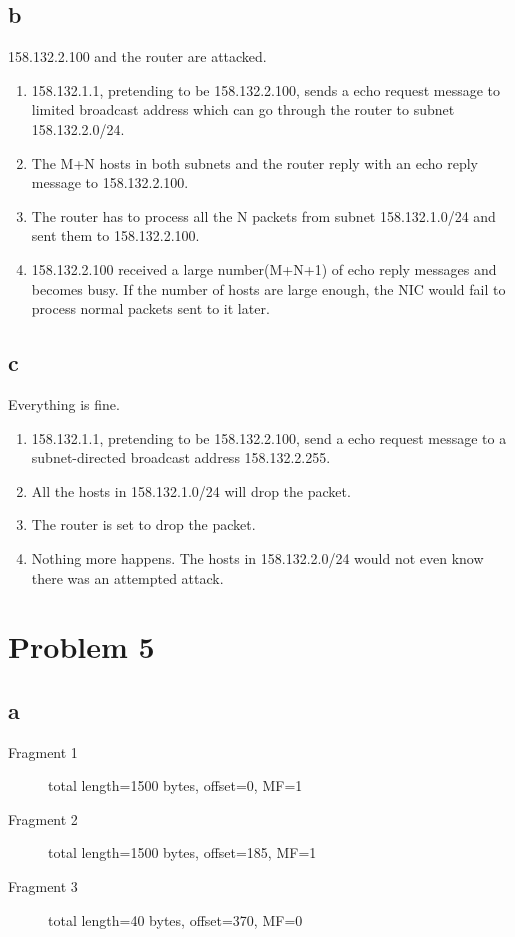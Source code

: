 \documentclass[11pt]{article}
\begin{document}
\subsection{b}
158.132.2.100 and the router are attacked.

\begin{enumerate}
\item 158.132.1.1, pretending to be 158.132.2.100, sends a echo request message to limited broadcast address which can go through the router to subnet 158.132.2.0/24.
\item The M+N hosts in both subnets and the router reply with an echo reply message to 158.132.2.100.
\item The router has to process all the N packets from subnet 158.132.1.0/24 and sent them to 158.132.2.100.
\item 158.132.2.100 received a large number(M+N+1) of echo reply messages and becomes busy. If the number of hosts are large enough, the NIC would fail to process normal packets sent to it later.
\end{enumerate}

\subsection{c}
Everything is fine.

\begin{enumerate}
\item 158.132.1.1, pretending to be 158.132.2.100, send a echo request message to a subnet-directed broadcast address 158.132.2.255.
\item All the hosts in 158.132.1.0/24 will drop the packet.
\item The router is set to drop the packet.
\item Nothing more happens. The hosts in 158.132.2.0/24 would not even know there was an attempted attack.
\end{enumerate}

\section{Problem 5}
\subsection{a}
\begin{description}
\item[Fragment 1] total length=1500 bytes, offset=0, MF=1
\item[Fragment 2] total length=1500 bytes, offset=185, MF=1
\item[Fragment 3] total length=40 bytes, offset=370, MF=0
\end{description}
\end{document}
